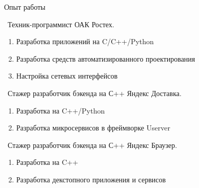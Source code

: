 \begin{rubric}{Опыт работы}

\entry*[2025 15.01 - 22.09]\ Техник-программист ОАК Ростех.

\begin{enumerate}
  \item Разработка приложений на C/C++/Python
  \item Разработка средств автоматизированного проектирования
  \item Настройка сетевых интерфейсов
\end{enumerate}

\entry*[2025 23.09 - 23.12]\  Стажер разработчик бэкенда на С++ Яндекс Доставка.

\begin{enumerate}
  \item Разработка на C++/Python
  \item Разработка микросервисов в фреймворке Userver
\end{enumerate}

\entry*[2026 27.05 - 09.09]\  Стажер разработчик бэкенда на С++ Яндекс Браузер.

\begin{enumerate}
  \item Разработка на C++
  \item Разработка декстопного приложения и сервисов
\end{enumerate}

\end{rubric}
